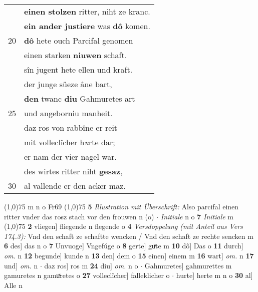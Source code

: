 \documentclass[8pt,a4paper,notitlepage]{article}
\begin{document}
\begin{table}[ht]
\begin{minipage}[t]{0.5\linewidth}
\begin{tabular}{rl}
 & \textbf{einen stolzen} ritter, niht ze kranc.\\ 
 & \textbf{ein ander justiere} was \textbf{dô} komen.\\ 
20 & \textbf{dô} hete ouch Parcifal genomen\\ 
 & einen starken \textbf{niuwen} schaft.\\ 
 & sîn jugent hete ellen und kraft.\\ 
 & der junge süeze âne bart,\\ 
 & \textbf{den} twanc \textbf{diu} Gahmuretes art\\ 
25 & und angeborniu manheit.\\ 
 & daz ros von rabbîne er reit\\ 
 & mit volleclîcher h\textit{u}rte dar;\\ 
 & er nam der vier nagel war.\\ 
 & des wirtes ritter niht \textbf{gesaz},\\ 
30 & al vallende er den acker maz.\\ 
\end{tabular}
\scriptsize
\line(1,0){75} \newline
m n o Fr69 \newline
\line(1,0){75} \newline
\textbf{5} \textit{Illustration mit Überschrift:} Also parcifal einen ritter vnder das rosz stach vor den frouwen n (o)   $\cdot$ \textit{Initiale} n o  \textbf{7} \textit{Initiale} m  \newline
\line(1,0){75} \newline
\textbf{2} vliegen] fliegende n flegende o \textbf{4} \textit{Versdoppelung (mit Anteil aus Vers 174.3):} Vnd den schaft ze schaftte wencken / Vnd den schaft ze rechte sencken m  \textbf{6} des] das n o \textbf{7} Unvuoge] Vngefúge o \textbf{8} gerte] guͯte m \textbf{10} dô] Das o \textbf{11} durch] \textit{om.} n \textbf{12} begunde] kunde n \textbf{13} den] dem o \textbf{15} einen] einem m \textbf{16} wart] \textit{om.} n \textbf{17} und] \textit{om.} n  $\cdot$ daz ros] ros m \textbf{24} diu] \textit{om.} n o  $\cdot$ Gahmuretes] gahmurettes m gamuretes n gamuͯretes o \textbf{27} volleclîcher] falleklicher o  $\cdot$ hurte] herte m n o \textbf{30} al] Alle n \newline
\end{minipage}
\end{table}
\newpage
\end{document}
